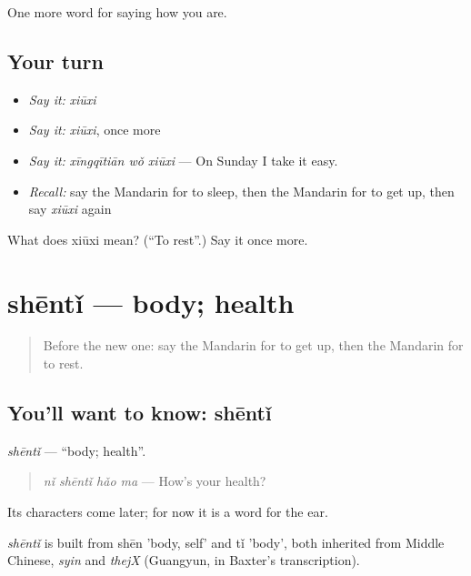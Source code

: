 \begin{grammarlens}[title={What you've built}]
One more word for saying how you are.
\end{grammarlens}

\subsection*{Your turn}
\begin{itemize}
\raggedright
  \item \emph{Say it:} \emph{xiūxi}
  \item \emph{Say it:} \emph{xiūxi}, once more
  \item \emph{Say it:} \emph{xīngqītiān wǒ xiūxi} — On Sunday I take it easy.
  \item \emph{Recall:} say the Mandarin for to sleep, then the Mandarin for to get up, then say \emph{xiūxi} again
\end{itemize}

\begin{tcolorbox}[breakable,colback=teal!4,colframe=teal!35!black,title={Before you move on}]
What does xiūxi mean? (\textquotedblleft{}To rest\textquotedblright{}.) Say it once more.
\end{tcolorbox}
\section[shēntǐ]{shēntǐ — body; health}

\label{lesson:ZH-C50-shenti}



\begin{quote}
Before the new one: say the Mandarin for to get up, then the Mandarin for to rest.
\end{quote}

\subsection*{You'll want to know: shēntǐ}
\emph{shēntǐ} — \textquotedblleft{}body; health\textquotedblright{}.

\begin{quote}
\emph{nǐ shēntǐ hǎo ma} — How's your health?
\end{quote}

Its characters come later; for now it is a word for the ear.

\begin{cousinweb}
\emph{shēntǐ} is built from shēn 'body, self' and tǐ 'body', both inherited from Middle Chinese, \emph{syin} and \emph{thejX} (Guangyun, in Baxter's transcription).
\end{cousinweb}

